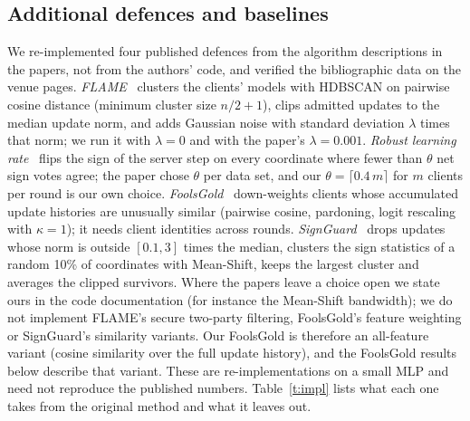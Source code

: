 \documentclass[conference]{IEEEtran}
\begin{document}
\subsection{Additional defences and baselines}
\label{sec:lit-method}
We re-implemented four published defences from the algorithm descriptions in the papers, not from the authors' code, and verified the bibliographic data on the venue pages. \emph{FLAME}~\cite{nguyen2022flame} clusters the clients' models with HDBSCAN on pairwise cosine distance (minimum cluster size $n/2+1$), clips admitted updates to the median update norm, and adds Gaussian noise with standard deviation $\lambda$ times that norm; we run it with $\lambda=0$ and with the paper's $\lambda=0.001$. \emph{Robust learning rate}~\cite{ozdayi2021rlr} flips the sign of the server step on every coordinate where fewer than $\theta$ net sign votes agree; the paper chose $\theta$ per data set, and our $\theta=\lceil 0.4\,m\rceil$ for $m$ clients per round is our own choice. \emph{FoolsGold}~\cite{fung2020foolsgold} down-weights clients whose accumulated update histories are unusually similar (pairwise cosine, pardoning, logit rescaling with $\kappa=1$); it needs client identities across rounds. \emph{SignGuard}~\cite{xu2022signguard} drops updates whose norm is outside $[0.1,3]$ times the median, clusters the sign statistics of a random 10\% of coordinates with Mean-Shift, keeps the largest cluster and averages the clipped survivors. Where the papers leave a choice open we state ours in the code documentation (for instance the Mean-Shift bandwidth); we do not implement FLAME's secure two-party filtering, FoolsGold's feature weighting or SignGuard's similarity variants. Our FoolsGold is therefore an all-feature variant (cosine similarity over the full update history), and the FoolsGold results below describe that variant. These are re-implementations on a small MLP and need not reproduce the published numbers. Table~\ref{t:impl} lists what each one takes from the original method and what it leaves out.
\end{document}
